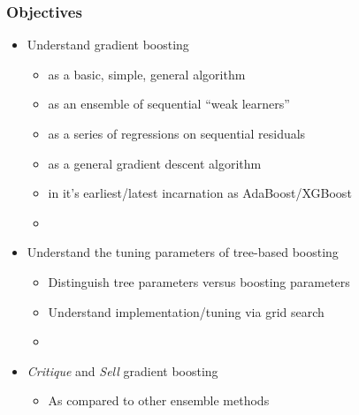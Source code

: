 \documentclass[xcolor={dvipsnames}]{beamer}
\begin{document}
\frame
{
 \frametitle{Objectives}

\begin{itemize}
\item Understand gradient boosting   
\begin{itemize}
\item<2-> as a basic, simple, general algorithm  
\item<3-> as an ensemble of sequential ``weak learners''
\item<4-> as a series of regressions on sequential residuals
\item<5-> as a general gradient descent algorithm  
\item<6-> in it's earliest/latest incarnation as AdaBoost/XGBoost
\item[]
\end{itemize}
\item<7-> Understand the tuning parameters of tree-based boosting
\begin{itemize}
\item<8-> Distinguish tree parameters versus boosting parameters 
\item<9-> Understand implementation/tuning via grid search 
\item[]
\end{itemize}
\item<10-> \emph{Critique} and \emph{Sell} gradient boosting 
\begin{itemize}
\item<11-> As compared to other ensemble methods
\end{itemize}
\end{itemize}

}
\end{document}

